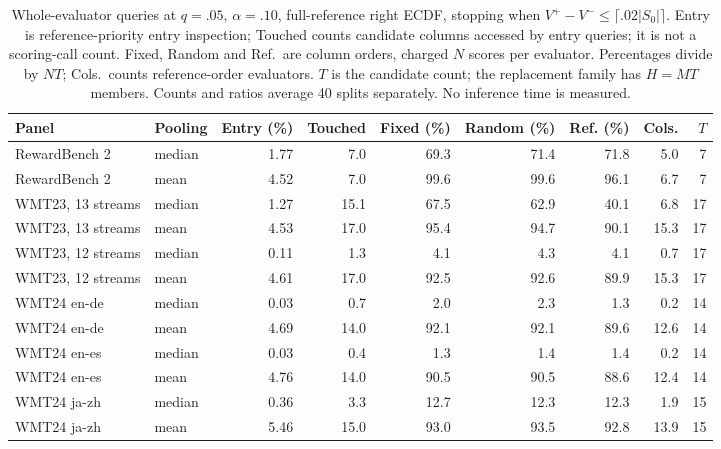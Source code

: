 \begin{table}[t]
\centering\small
\begin{tabular}{llrrrrrrr}
\toprule
Panel & Pooling & Entry (\%) & Touched & Fixed (\%) & Random (\%) & Ref. (\%) & Cols. & $T$ \\
\midrule
RewardBench 2 & median & 1.77 & 7.0 & 69.3 & 71.4 & 71.8 & 5.0 & 7 \\
RewardBench 2 & mean & 4.52 & 7.0 & 99.6 & 99.6 & 96.1 & 6.7 & 7 \\
WMT23, 13 streams & median & 1.27 & 15.1 & 67.5 & 62.9 & 40.1 & 6.8 & 17 \\
WMT23, 13 streams & mean & 4.53 & 17.0 & 95.4 & 94.7 & 90.1 & 15.3 & 17 \\
WMT23, 12 streams & median & 0.11 & 1.3 & 4.1 & 4.3 & 4.1 & 0.7 & 17 \\
WMT23, 12 streams & mean & 4.61 & 17.0 & 92.5 & 92.6 & 89.9 & 15.3 & 17 \\
WMT24 en-de & median & 0.03 & 0.7 & 2.0 & 2.3 & 1.3 & 0.2 & 14 \\
WMT24 en-de & mean & 4.69 & 14.0 & 92.1 & 92.1 & 89.6 & 12.6 & 14 \\
WMT24 en-es & median & 0.03 & 0.4 & 1.3 & 1.4 & 1.4 & 0.2 & 14 \\
WMT24 en-es & mean & 4.76 & 14.0 & 90.5 & 90.5 & 88.6 & 12.4 & 14 \\
WMT24 ja-zh & median & 0.36 & 3.3 & 12.7 & 12.3 & 12.3 & 1.9 & 15 \\
WMT24 ja-zh & mean & 5.46 & 15.0 & 93.0 & 93.5 & 92.8 & 13.9 & 15 \\
\bottomrule
\end{tabular}
\caption{Whole-evaluator queries at $q=.05$, $\alpha=.10$, full-reference right ECDF, stopping when $V^+-V^-\le\lceil.02|S_0|\rceil$. Entry is reference-priority entry inspection; Touched counts candidate columns accessed by entry queries; it is not a scoring-call count. Fixed, Random and Ref.\ are column orders, charged $N$ scores per evaluator. Percentages divide by $NT$; Cols.\ counts reference-order evaluators. $T$ is the candidate count; the replacement family has $H=MT$ members. Counts and ratios average 40 splits separately. No inference time is measured.}
\label{tab:column-summary}
\end{table}
